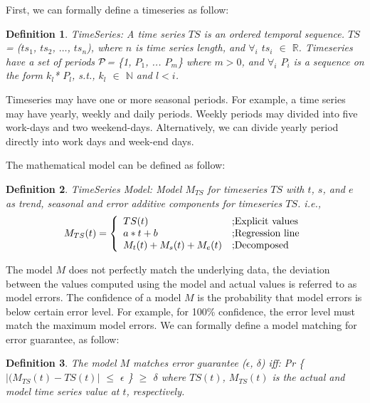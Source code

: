 \documentclass[10pt,conference,letterpaper]{IEEEtran}
\newtheorem{mydef}{Definition}
\begin{document}
First, we can formally define a timeseries as follow:
\begin{mydef} TimeSeries: A time series $TS$ is an ordered temporal sequence. $TS$= ($ts_1$, $ts_2$, $\dots$, $ts_n$), where $n$ is time series length, and $\forall_i$ $ts_i$ $\in$ $\mathbb{R}$. Timeseries have a set of periods $\cal P$= \{1, $P_1$, ... $P_m$\} where $m > 0$, and $\forall_i$ $P_i$ is a sequence on the form $k_l$* $P_l$, s.t., $k_l$ $\in$ $\mathbb{N}$ and $l<i$.
\end{mydef}

Timeseries may have one or more seasonal periods. For example, a time series may have  yearly, weekly and daily periods. Weekly periods may divided into five work-days and two weekend-days. Alternatively, we can  divide yearly period directly into work days and week-end days.
 
The mathematical model can be defined as follow:
\begin{mydef} TimeSeries Model: Model $M_{TS}$ for timeseries $TS$ with  $t$, $s$, and $e$ as trend, seasonal and error additive components for timeseries $TS$. i.e.,   
\[
  M_{TS}(t) = \left\{ 
  \begin{array}{l l}
    TS (t) &  \text{;Explicit values}
    \\
    a*t+b             & \text{;Regression line} \\
    M_{t}(t)+M_{s}(t)+M_{e}(t) &  \text{;Decomposed}\\
  \end{array} \right.
\]
\end{mydef}

The model $M$ does not perfectly match the underlying data, the deviation between the values computed using the model  and actual values is referred to as model errors. The confidence of a model $M$ is the probability that model errors is below certain error level. For example, for 100\% confidence, the error level must match the maximum model errors. We can formally define a  model matching for  error guarantee, as follow:
\begin{mydef} The model $M$ matches error guarantee ($\epsilon$, $\delta$) iff: 
Pr \{ $|(M_{TS}(t) - TS(t)|$ $\leq$ $\epsilon$ \} $\geq$ $\delta$ where $TS(t)$, $M_{TS}(t)$ is the actual and model time series value at $t$, respectively.
\end{mydef}
\end{document}
